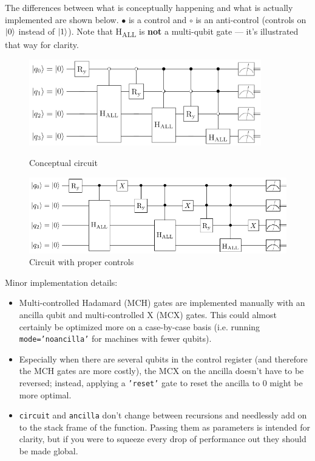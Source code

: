 \documentclass[12pt]{article}
\begin{document}
\noindent The differences between what is conceptually happening and what is actually implemented are shown below. $\bullet$ is a control and $\circ$ is an anti-control (controls on $\ket{0}$ instead of $\ket{1}$). Note that H\textsubscript{ALL} is \textbf{not} a multi-qubit gate --- it's illustrated that way for clarity.
\begin{figure}[H]
    \centering
    \includegraphics[width=0.9\textwidth]{images/circuits/conceptual_circuit.pdf}
    \caption{Conceptual circuit}
    \vspace{10mm}
    \includegraphics[width=\textwidth]{images/circuits/optimized_circuit.pdf}
    \caption{Circuit with proper controls}
    \label{fig:circs}
\end{figure}

\vspace{20mm}
\noindent Minor implementation details:
\begin{itemize}
    \item Multi-controlled Hadamard (MCH) gates are implemented manually with an ancilla qubit and multi-controlled X (MCX) gates. This could almost certainly be optimized more on a case-by-case basis (i.e. running \texttt{mode='noancilla'} for machines with fewer qubits).
    \item Especially when there are several qubits in the control register (and therefore the MCH gates are more costly), the MCX on the ancilla doesn't have to be reversed; instead, applying a  \texttt{'reset'} gate to reset the ancilla to 0 might be more optimal.
    \item \texttt{circuit} and \texttt{ancilla} don't change between recursions and needlessly add on to the stack frame of the function. Passing them as parameters is intended for clarity, but if you were to squeeze every drop of performance out they should be made global.
\end{itemize}
\end{document}
